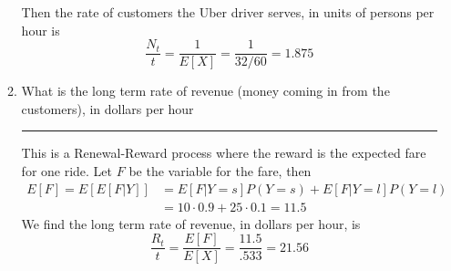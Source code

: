 \documentclass{article} %
\theoremstyle{plain}
\theoremstyle{case}
\begin{document}
\begin{enumerate}[label={\fbox{\textbf{Exercise \#\arabic* :}}}]
\begin{enumerate}
       Then the rate of customers the Uber driver serves, in units of persons per hour is
       \[ \frac{N_t}{t}  = \frac{1}{E[X]}  = \frac{1}{32/60} = 1.875 \]
     \item What is the long term rate of revenue (money coming in from the customers), in dollars per hour
\par\noindent\rule{\textwidth}{0.1pt}
        This is a Renewal-Reward process where the reward is the expected
        fare for one ride.  Let $F$ be the variable for the fare, then
       \begin{align*}
         E[F] = E[E[F|Y]] &= E[F|Y=s]P(Y=s) + E[F|Y=l]P(Y=l)   \\
                          &= 10 \cdot 0.9 + 25 \cdot 0.1 = 11.5
       \end{align*}
        We find the long term rate of revenue, in dollars per hour, is
        \[ \frac{R_t}{t} = \frac{E[F]}{E[X]} = \frac{11.5}{.533} = 21.56 \]
    \end{enumerate}


\end{enumerate}
\end{document}
